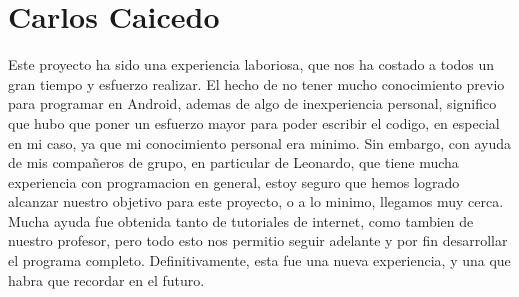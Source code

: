 \documentclass[10pt]{article}
\begin{document}
\section{Carlos Caicedo}
	Este proyecto ha sido una experiencia laboriosa, que nos ha costado a todos un gran tiempo y esfuerzo realizar. El hecho de no tener mucho conocimiento previo para programar en
Android, ademas de algo de inexperiencia personal, significo que hubo que poner un esfuerzo mayor para poder escribir el codigo, en especial en mi caso, ya que mi conocimiento personal
era minimo. Sin embargo, con ayuda de mis compañeros de grupo, en particular de Leonardo, que tiene mucha experiencia con programacion en general, estoy seguro que hemos logrado
alcanzar nuestro objetivo para este proyecto, o a lo minimo, llegamos muy cerca. Mucha ayuda fue obtenida tanto de tutoriales de internet, como tambien de nuestro profesor, pero
todo esto nos permitio seguir adelante y por fin desarrollar el programa completo. Definitivamente, esta fue una nueva experiencia, y una que habra que recordar en el futuro.

		
\end{document}
